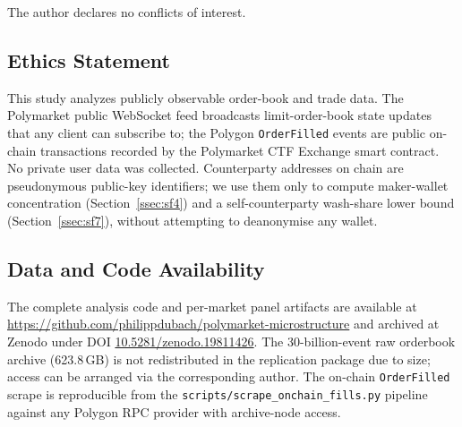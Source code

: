 \documentclass[11pt,a4paper,twocolumn]{article}
\begin{document}
The author declares no conflicts of interest.

\subsection{Ethics Statement}

This study analyzes publicly observable order-book and trade data.
The Polymarket public WebSocket feed broadcasts limit-order-book
state updates that any client can subscribe to; the Polygon
\texttt{OrderFilled} events are public on-chain transactions
recorded by the Polymarket CTF Exchange smart contract. No private
user data was collected. Counterparty addresses on chain are
pseudonymous public-key identifiers; we use them only to compute
maker-wallet concentration (Section~\ref{ssec:sf4}) and a
self-counterparty wash-share lower bound (Section~\ref{ssec:sf7}),
without attempting to deanonymise any wallet.

\subsection{Data and Code Availability}

The complete analysis code and per-market panel artifacts are
available at \url{https://github.com/philippdubach/polymarket-microstructure}
and archived at Zenodo under DOI
\href{https://doi.org/10.5281/zenodo.19811426}{10.5281/zenodo.19811426}.
The 30-billion-event raw orderbook archive (623.8\,GB) is not
redistributed in the replication package due to size; access can be
arranged via the corresponding author. The on-chain
\texttt{OrderFilled} scrape is reproducible from the
\texttt{scripts/scrape\_onchain\_fills.py} pipeline against any
Polygon RPC provider with archive-node access.
 
\clearpage


\end{document}
